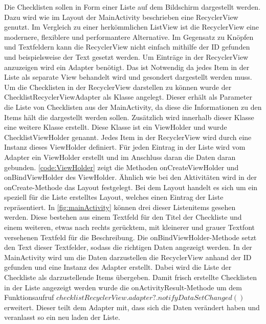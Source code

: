 Die Checklisten sollen in Form einer Liste auf dem Bildschirm dargestellt werden. Dazu wird wie im Layout der MainActivity beschrieben eine RecyclerView genutzt. Im Vergleich zu einer herkömmlichen ListView ist die RecyclerView eine modernere, flexiblere und performantere Alternative. Im Gegensatz zu Knöpfen und Textfeldern kann die RecyclerView nicht einfach mithilfe der ID gefunden und beispielsweise der Text gesetzt werden. Um Einträge in der RecyclerView anzuzeigen wird ein Adapter benötigt. Das ist Notwendig da jedes Item in der Liste als separate View behandelt wird und gesondert dargestellt werden muss. Um die Checklisten in der RecyclerView darstellen zu können wurde der ChecklistRecyclerViewAdapter als Klasse angelegt. Dieser erhält als Parameter die Liste von Checklisten aus der MainActivity, da diese die Informationen zu den Items hält die dargestellt werden sollen. Zusätzlich wird innerhalb dieser Klasse eine weitere Klasse erstellt. Diese Klasse ist ein ViewHolder und wurde ChecklistViewHolder genannt. Jedes Item in der RecyclerView wird durch eine Instanz dieses ViewHolder definiert. Für jeden Eintrag in der Liste wird vom Adapter ein ViewHolder erstellt und im Anschluss daran die Daten daran gebunden. \autoref{code:ViewHolder} zeigt die Methoden onCreateViewHolder und onBindViewHolder des ViewHolder. Ähnlich wie bei den Aktivitäten wird in der onCreate-Methode das Layout festgelegt. Bei dem Layout handelt es sich um ein speziell für die Liste erstelltes Layout, welches einen Eintrag der Liste repräsentiert. In \autoref{fig:mainActivity} können drei dieser Listenitems gesehen werden. Diese bestehen aus einem Textfeld für den Titel der Checkliste und einem weiteren, etwas nach rechts gerücktem, mit kleinerer und grauer Textfont versehenen Textfeld für die Beschreibung. Die onBindViewHolder-Methode setzt den Text dieser Textfelder, sodass die richtigen Daten angezeigt werden.
In der MainActivity wird um die Daten darzustellen die RecyclerView anhand der ID gefunden und eine Instanz des Adapter erstellt. Dabei wird die Liste der Checkliste als darzustellende Items übergeben. Damit frisch erstellte Checklisten in der Liste angezeigt werden wurde die onActivityResult-Methode um dem Funktionsaufruf 
$checklistRecyclerView.adapter?.notifyDataSetChanged()$ erweitert. Dieser teilt dem Adapter mit, dass sich die Daten verändert haben und veranlasst so ein neu laden der Liste.\\
\\


